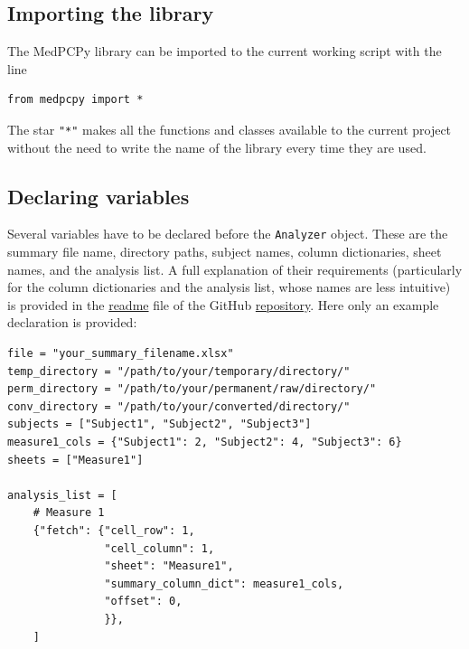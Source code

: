 \documentclass[a4paper,12pt]{article}
\begin{document}
\subsection{Importing the library}

The MedPCPy library can be imported to the current working script with the line

\begin{tcolorbox}[
    enhanced,
    attach boxed title to top left={xshift=6mm,yshift=-3mm},
    colback=lightgreen!20,
    colframe=lightgreen,
    colbacktitle=lightgreen,
    title=Python,
    fonttitle=\bfseries\color{black},
    boxed title style={size=small,colframe=lightgreen,sharp corners},
    sharp corners,
    ]
    \begin{verbatim}
from medpcpy import *
    \end{verbatim}
\end{tcolorbox}

The star \verb|"*"| makes all the functions and classes available to the current project without the need to write the name of the library every time they are used.

\subsection{Declaring variables}

Several variables have to be declared before the \verb|Analyzer| object. These are the summary file name, directory paths, subject names, column dictionaries, sheet names, and the analysis list. A full explanation of their requirements (particularly for the column dictionaries and the analysis list, whose names are less intuitive) is provided in the \href{https://github.com/JuodaanViinaa/Laboratorio/blob/translate/README.md}{readme} file of the GitHub \href{https://github.com/JuodaanViinaa/Laboratorio/tree/translate}{repository}. Here only an example declaration is provided:

\begin{tcolorbox}[
    enhanced,
    attach boxed title to top left={xshift=6mm,yshift=-3mm},
    colback=lightgreen!20,
    colframe=lightgreen,
    colbacktitle=lightgreen,
    title=Python,
    fonttitle=\bfseries\color{black},
    boxed title style={size=small,colframe=lightgreen,sharp corners},
    sharp corners,
    ]
    \begin{verbatim}
file = "your_summary_filename.xlsx"
temp_directory = "/path/to/your/temporary/directory/"
perm_directory = "/path/to/your/permanent/raw/directory/"
conv_directory = "/path/to/your/converted/directory/"
subjects = ["Subject1", "Subject2", "Subject3"]
measure1_cols = {"Subject1": 2, "Subject2": 4, "Subject3": 6}
sheets = ["Measure1"]

analysis_list = [
    # Measure 1
    {"fetch": {"cell_row": 1,
               "cell_column": 1,
               "sheet": "Measure1",
               "summary_column_dict": measure1_cols,
               "offset": 0,
               }},
    ]
    \end{verbatim}
\end{tcolorbox}
\end{document}
